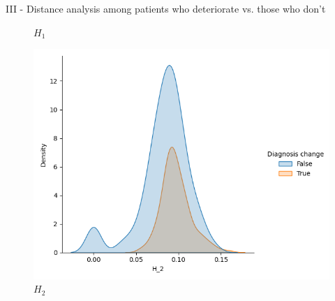 \documentclass[aspectratio=169, 10pt, dvipsnames]{beamer}
\begin{document}
\begin{frame}[fragile]{III - Distance analysis among patients who deteriorate vs. those who don't}
\begin{figure}
    \caption{$H_1$}
  \end{figure}%
  \endminipage
  \hfill
  \begin{figure}
    \centering
     \includegraphics[width=\textwidth]{figures/temporal_evolution/bottleneck_H_2_dist_diag_change.png}
    \caption{$H_2$}
  \end{figure}
  \endminipage
\end{frame}
\end{document}
